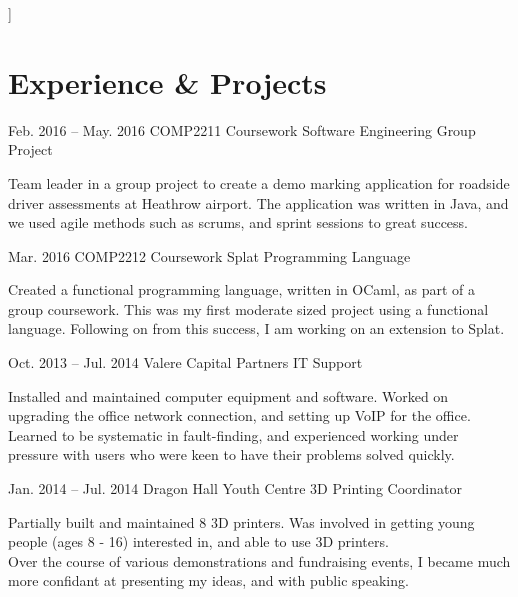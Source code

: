 \documentclass{tccv}
\begin{document}
\hline
\bigskip
]



    

\section{Experience \& Projects}

    \begin{eventlist}
    
        \item{Feb. 2016 -- May. 2016}
             {COMP2211 Coursework}
             {Software Engineering Group Project}
        
        Team leader in a group project to create a demo marking application for roadside driver assessments at Heathrow airport. The application was written in Java, and we used agile methods such as scrums, and sprint sessions to great success.
        
        \item{Mar. 2016}
             {COMP2212 Coursework}
             {Splat Programming Language}
        
        Created a functional programming language, written in OCaml, as part of a group coursework. This was my first moderate sized project using a functional language. Following on from this success, I am working on an extension to Splat.
        
        \item{Oct. 2013 -- Jul. 2014}
             {Valere Capital Partners}
             {IT Support}
        
        Installed and maintained computer equipment and software. Worked on upgrading the office network connection, and setting up VoIP for the office. Learned to be systematic in fault-finding, and experienced working under pressure with users who were keen to have their problems solved quickly.
        
        \item{Jan. 2014 -- Jul. 2014}
             {Dragon Hall Youth Centre}
             {3D Printing Coordinator}
        
        Partially built and maintained 8 3D printers. Was involved in getting young people (ages 8 - 16) interested in, and able to use 3D printers.\\
        Over the course of various demonstrations and fundraising events, I became much more confidant at presenting my ideas, and with public speaking.
        

\end{eventlist}
\end{document}
